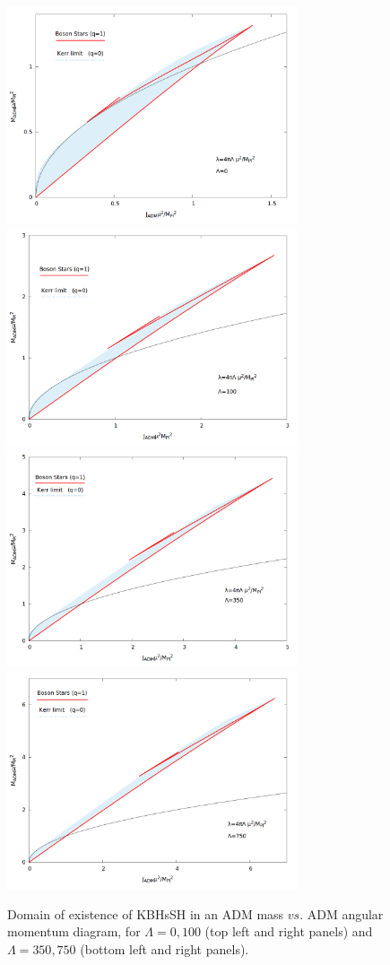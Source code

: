 \begin{figure}[h!]
  \begin{center}
    \includegraphics[width=8.55cm]{papers/selfInteractions/c2=0-J-M.png}
     \includegraphics[width=8.55cm]{papers/selfInteractions/c2=100-J-M.png}
      \includegraphics[width=8.55cm]{papers/selfInteractions/c2=350-J-M.png}
       \includegraphics[width=8.55cm]{papers/selfInteractions/c2=750-J-M.png}
  \end{center}
  \caption{Domain of existence of KBHsSH in an ADM mass $vs.$ ADM angular momentum diagram, for $\Lambda=0,100$ (top left and right panels) and $\Lambda=350,750$ (bottom left and right panels).}
  \label{fig:no-HBHs}
\end{figure}
 

